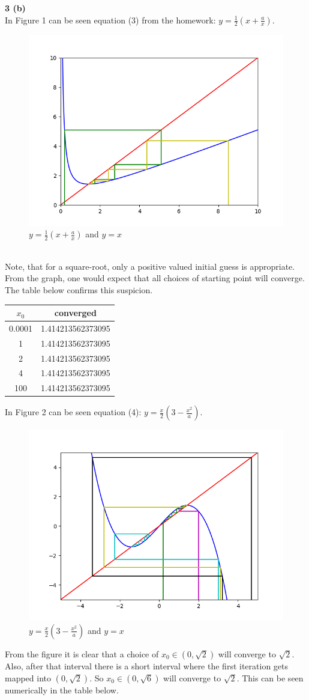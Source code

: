 \documentclass[12pt]{article}
\newcommand{\problem}[1]{\hspace{-4 ex} \large \textbf{#1}\\}
\begin{document}
\problem{3 (b)}
	In Figure 1 can be seen equation (3) from the homework: $y=\frac{1}{2}(x+\frac{a}{x})$.
	\begin{figure}[h]
		\caption{$y=\frac{1}{2}(x+\frac{a}{x})$ and $y=x$}
		\centering
		\includegraphics[width=.5\textwidth]{hw2_figure_1}
	\end{figure}\\
	Note, that for a square-root, only a positive valued initial guess is appropriate. From the graph, one would expect that all choices of starting point will converge. The table below confirms this suspicion. 
	\begin{center}
		\begin{tabular}{|c|c|}
			\hline
			$x_0$&converged\\ \hline
			0.0001&1.414213562373095\\ \hline
			1&1.414213562373095\\ \hline
			2&1.414213562373095\\ \hline
			4&1.414213562373095\\ \hline
			100&1.414213562373095\\ \hline
		\end{tabular}
	\end{center}
	
	In Figure 2 can be seen equation (4): $y=\frac{x}{2}(3-\frac{x^2}{a})$.
	\begin{figure}[h]
		\caption{$y=\frac{x}{2}(3-\frac{x^2}{a})$ and $y=x$}
		\centering
		\includegraphics[width=.75\textwidth]{hw2_figure_2}
	\end{figure}
	From the figure it is clear that a choice of $x_0 \in (0,\sqrt{2})$ will converge to $\sqrt{2}$. Also, after that interval there is a short interval where the first iteration gets mapped into $(0,\sqrt{2})$. So $x_0 \in (0,\sqrt{6})$ will converge to $\sqrt{2}$. This can be seen numerically in the table below.
	
\end{document}
